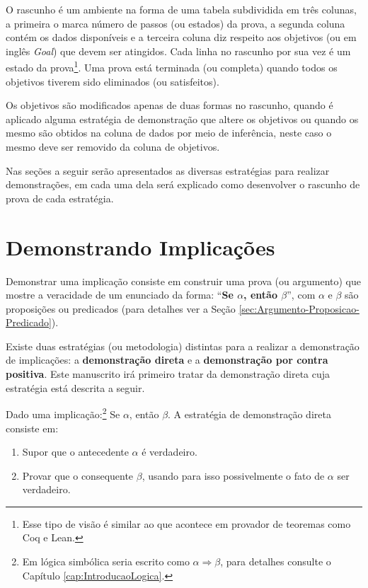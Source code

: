 O rascunho é um ambiente na forma de uma tabela subdividida em três colunas, a primeira o marca número de passos (ou estados) da prova, a segunda coluna contém os dados disponíveis e a terceira coluna diz respeito aos objetivos (ou em inglês \textit{Goal}) que devem ser atingidos. Cada linha no rascunho por sua vez é um estado da prova\footnote{Esse tipo de visão é similar ao que acontece em provador de teoremas como Coq \cite{coq2013} e Lean.}. Uma prova está terminada (ou completa) quando todos os objetivos tiverem sido eliminados (ou satisfeitos). 

\begin{remark}
    Os objetivos são modificados apenas de duas formas no rascunho, quando é aplicado alguma estratégia de demonstração que altere os objetivos ou quando os mesmo são obtidos na coluna de dados por meio de inferência, neste caso o mesmo deve ser removido da coluna de objetivos.
\end{remark}

Nas seções a seguir serão apresentados as diversas estratégias para realizar demonstrações, em cada uma dela será explicado como desenvolver o rascunho de prova de cada estratégia.

\section{Demonstrando Implicações}\label{sec:ProvandoImplicacao}

Demonstrar uma implicação consiste em construir uma prova (ou argumento) que mostre a veracidade de um enunciado da forma: ``\textbf{Se $\alpha$, então $\beta$}'', com  $\alpha$ e $\beta$ são proposições ou predicados (para detalhes ver a Seção \ref{sec:Argumento-Proposicao-Predicado}). 

Existe duas estratégias (ou metodologia) distintas para a realizar a demonstração de implicações: a \textbf{demonstração direta} e a \textbf{demonstração por contra positiva}. Este manuscrito irá primeiro tratar da demonstração direta cuja estratégia está descrita a seguir.

\begin{definition}\label{Def:DemDireta}
    Dado uma implicação:\footnote{Em lógica simbólica seria escrito como $\alpha \Rightarrow \beta$, para detalhes consulte o Capítulo \ref{cap:IntroducaoLogica}.} Se $\alpha$, então $\beta$. A estratégia de demonstração direta consiste em:
	\begin{enumerate}
		\item Supor que o antecedente $\alpha$ é verdadeiro.
		\item Provar que o consequente $\beta$, usando para isso possivelmente o fato de $\alpha$ ser verdadeiro.
	\end{enumerate}
\end{definition}


